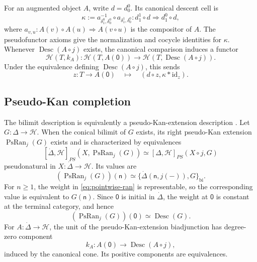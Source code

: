 \documentclass[11pt,a4paper]{article}
\numberwithin{equation}{section}
\theoremstyle{definition}
\theoremstyle{remark}
\newcommand{\id}{\mathrm{id}}
\newcommand{\Hcat}{\mathcal H}
\newcommand{\PsRan}{\operatorname{PsRan}}
\newcommand{\Desc}{\operatorname{Desc}}
\begin{document}
For an augmented object $A$, write $d=d_0^0$. Its canonical descent
cell is
\begin{equation}
  \kappa
  :=a_{\delta_1^0,\delta_0^0}^{-1}
     \circ a_{\delta_1^1,\delta_0^0}
  \colon d_1^1\circ d\Longrightarrow d_1^0\circ d,
  \label{eq:canonical-descent-cell}
\end{equation}
where $a_{v,u}\colon A(v)\circ A(u)\Rightarrow A(v\circ u)$ is the
compositor of $A$. The pseudofunctor axioms give the normalization
and cocycle identities for $\kappa$. Whenever $\Desc(A\circ j)$
exists, the canonical comparison induces a functor
\[
  \Hcat(T,k_A)\colon
  \Hcat(T,A(\mathsf0))\longrightarrow\Hcat(T,\Desc(A\circ j)).
\]
Under the equivalence defining $\Desc(A\circ j)$, this sends
\[
  z\colon T\to A(\mathsf 0)
  \quad\longmapsto\quad
  (d\circ z,\kappa\ast\id_z).
\]


\subsection{Pseudo-Kan completion}

The bilimit description is equivalently a pseudo-Kan-extension
description \cite[Corollary~3.27 and Theorem~4.11]{Nunes2018}.
Let $G\colon\Delta\to\Hcat$. When the conical bilimit of $G$ exists,
its right pseudo-Kan extension $\PsRan_j(G)$ exists and is
characterized by equivalences
\[
  [\dot\Delta,\Hcat]_{PS}(X,\PsRan_j(G))
  \simeq[\Delta,\Hcat]_{PS}(X\circ j,G)
\]
pseudonatural in $X\colon\dot\Delta\to\Hcat$. Its values are
\begin{equation}
  (\PsRan_j(G))(\mathsf n)
  \simeq
  \{\dot\Delta(\mathsf n,j(-)),G\}_{\mathrm{bi}}.
  \label{eq:pointwise-ran}
\end{equation}
For $n\geq1$, the weight in \eqref{eq:pointwise-ran} is representable,
so the corresponding value is equivalent to $G(\mathsf n)$. Since
$\mathsf0$ is initial in $\dot\Delta$, the weight at $\mathsf0$ is
constant at the terminal category, and hence
\begin{equation}
  (\PsRan_j(G))(\mathsf0)\simeq\Desc(G).
  \label{eq:descent-as-ran}
\end{equation}
For $A\colon\dot\Delta\to\Hcat$, the unit of the
pseudo-Kan-extension biadjunction has degree-zero component
\begin{equation}
  k_A\colon A(\mathsf 0)\longrightarrow\Desc(A\circ j),
  \label{eq:descent-comparison}
\end{equation}
induced by the canonical cone. Its positive components are
equivalences.
\end{document}
